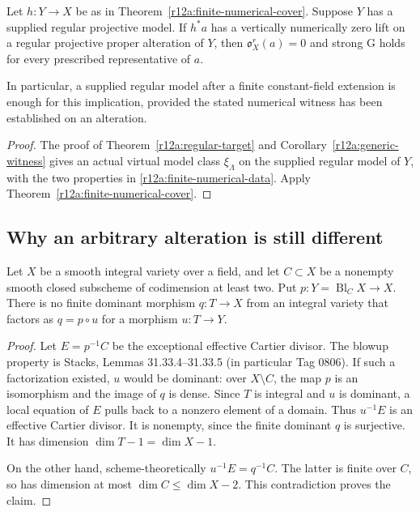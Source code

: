 \begin{corollary}
\label{r12a:finite-regular-cover}
Let $h:Y\to X$ be as in Theorem~\ref{r12a:finite-numerical-cover}.
Suppose $Y$ has a supplied regular projective model.  If $h^*a$ has
a vertically numerically zero lift on a regular projective proper
alteration of $Y$, then $\mathfrak o_X^r(a)=0$ and strong G holds for
every prescribed representative of $a$.

In particular, a supplied regular model after a finite constant-field
extension is enough for this implication, provided the stated numerical
witness has been established on an alteration.
\end{corollary}

\begin{proof}
The proof of Theorem~\ref{r12a:regular-target} and
Corollary~\ref{r12a:generic-witness} gives an actual virtual model
class $\xi_\Lambda$ on the supplied regular model of $Y$, with the
two properties in \eqref{r12a:finite-numerical-data}.
Apply Theorem~\ref{r12a:finite-numerical-cover}.
\end{proof}

\subsection{Why an arbitrary alteration is still different}

\begin{proposition}
\label{r12a:no-finite-blowup-cover}
Let $X$ be a smooth integral variety over a field, and let
$C\subset X$ be a nonempty smooth closed subscheme of codimension
at least two.  Put $p:Y=\operatorname{Bl}_C X\to X$.
There is no finite dominant morphism $q:T\to X$ from an integral
variety that factors as $q=p\circ u$ for a morphism $u:T\to Y$.
\end{proposition}

\begin{proof}
Let $E=p^{-1}C$ be the exceptional effective Cartier divisor.
The blowup property is Stacks, Lemmas 31.33.4--31.33.5
(in particular Tag 0806).  If such a factorization existed,
$u$ would be dominant: over $X\setminus C$, the map $p$ is an
isomorphism and the image of $q$ is dense.
Since $T$ is integral and $u$ is dominant, a local equation of $E$
pulls back to a nonzero element of a domain.  Thus $u^{-1}E$ is an
effective Cartier divisor.  It is nonempty, since the finite dominant
$q$ is surjective.  It has dimension $\dim T-1=\dim X-1$.

On the other hand, scheme-theoretically $u^{-1}E=q^{-1}C$.
The latter is finite over $C$, so has dimension at most
$\dim C\le\dim X-2$.  This contradiction proves the claim.
\end{proof}

